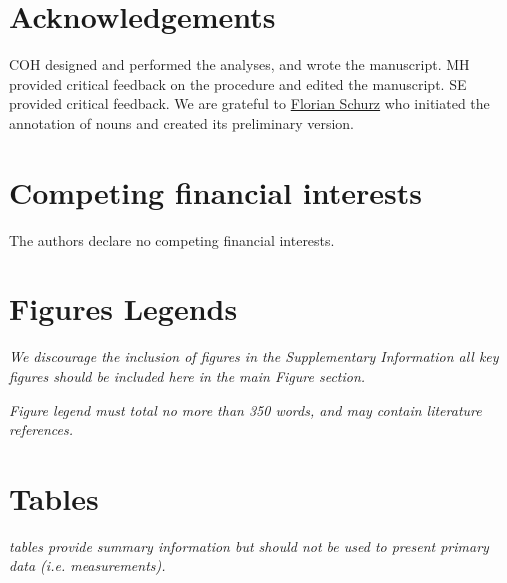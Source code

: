 \documentclass[english]{article}
\begin{document}



\section*{Acknowledgements}

%
COH designed and performed the analyses, and wrote the manuscript.
%
MH provided critical feedback on the procedure and edited the manuscript.
%
SE provided critical feedback.
%
We are grateful to \href{www.florianschurz.de}{Florian Schurz} who initiated the
annotation of nouns and created its preliminary version.%


\section*{Competing financial interests}
The authors declare no competing financial interests.


\section*{Figures Legends}


\emph{We discourage the inclusion of figures in the
Supplementary Information \textendash{} all key figures should be included here
in the main Figure section.}

\emph{Figure legend must total no more
than 350 words, and may contain literature references.}


\section*{Tables}

\emph{tables provide summary information but should not be used to present
primary data (i.e. measurements).}


{\small
}
\end{document}
